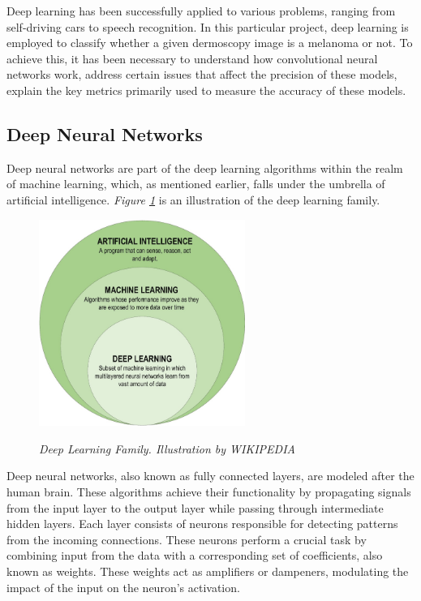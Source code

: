 Deep learning has been successfully applied to various problems, ranging from self-driving cars to speech recognition. In this particular project, deep learning is employed to classify whether a given dermoscopy image is a melanoma or not. To achieve this, it has been necessary to understand how convolutional neural networks work, address certain issues that affect the precision of these models, explain the key metrics primarily used to measure the accuracy of these models.


\subsection{Deep Neural Networks}

Deep neural networks are part of the deep learning algorithms within the realm of machine learning, which, as mentioned earlier, falls under the umbrella of artificial intelligence. \textit{Figure \ref{fig:deep-learning-family}} is an illustration of the deep learning family. \\

\begin{figure}[H]
\centering
\includegraphics[width=0.6\textwidth]{imatges/preliminaries/deep-learning-familiy.png}
\caption[Deep Learning Family]{\textit{Deep Learning Family. Illustration by WIKIPEDIA}}
{\label{fig:deep-learning-family}}
\end{figure}

Deep neural networks, also known as fully connected layers, are modeled after the human brain. These algorithms achieve their functionality by propagating signals from the input layer to the output layer while passing through intermediate hidden layers. Each layer consists of neurons responsible for detecting patterns from the incoming connections. These neurons perform a crucial task by combining input from the data with a corresponding set of coefficients, also known as weights. These weights act as amplifiers or dampeners, modulating the impact of the input on the neuron's activation. \\

